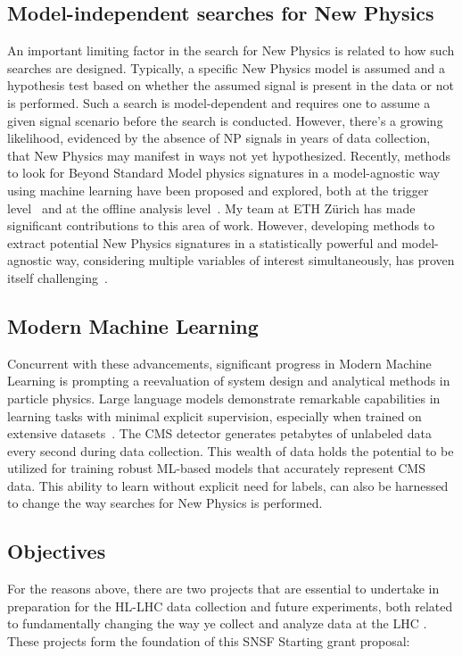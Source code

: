 \documentclass[12pt]{iopart}
\begin{document}
\subsection{Model-independent searches for New Physics}
An important limiting factor in the search for New Physics is related to how such searches are designed. Typically, a specific New Physics model is assumed and a hypothesis test based on whether the assumed signal is present in the data or not is performed. Such a search is model-dependent and requires one to assume a given signal scenario before the search is conducted. However, there's a growing likelihood, evidenced by the absence of NP signals in years of data collection, that New Physics may manifest in ways not yet hypothesized. Recently, methods to look for Beyond Standard Model physics signatures in a model-agnostic way using machine learning have been proposed and explored, both at the trigger level~\cite{CMS-DP-2023-079,BELIS2024100091} and at the offline analysis level~\cite{Harris:2881089,BELIS2024100091}. My team at ETH Zürich has made significant contributions to this area of work. However, developing methods to extract potential New Physics signatures in a statistically powerful and model-agnostic way, considering multiple variables of interest simultaneously, has proven itself challenging~\cite{D_Agnolo_2019}.

\subsection{Modern Machine Learning}
Concurrent with these advancements, significant progress in Modern Machine Learning is prompting a reevaluation of system design and analytical methods in particle physics. Large language models demonstrate remarkable capabilities in learning tasks with minimal explicit supervision, especially when trained on extensive datasets~\cite{Radford2019LanguageMA,brown2020language}. The CMS detector generates petabytes of unlabeled data every second during data collection. This wealth of data holds the potential to be utilized for training robust ML-based models that accurately represent CMS data. This ability to learn without explicit need for labels, can also be harnessed to change the way searches for New Physics is performed.

\subsection{Objectives}
For the reasons above, there are two projects that are essential to undertake in preparation for the HL-LHC data collection and future experiments, both related to fundamentally changing the way ye collect and analyze data at the LHC . These projects form the foundation of this SNSF Starting grant proposal:
\end{document}
